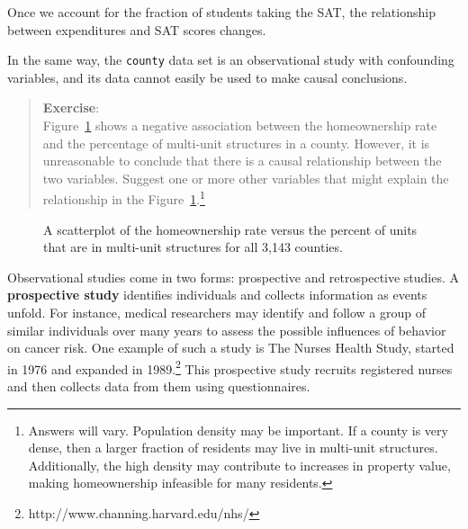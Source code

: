 \documentclass[
  letterpaper,
  DIV=11,
  numbers=noendperiod]{scrreprt}
\begin{document}
Once we account for the fraction of students taking the SAT, the
relationship between expenditures and SAT scores changes.

In the same way, the \texttt{county} data set is an observational study
with confounding variables, and its data cannot easily be used to make
causal conclusions.

\begin{quote}
\textbf{Exercise}:\\
Figure~\ref{fig-homeown2} shows a negative association between the
homeownership rate and the percentage of multi-unit structures in a
county. However, it is unreasonable to conclude that there is a causal
relationship between the two variables. Suggest one or more other
variables that might explain the relationship in the
Figure~\ref{fig-homeown2}.\footnote{Answers will vary. Population
  density may be important. If a county is very dense, then a larger
  fraction of residents may live in multi-unit structures. Additionally,
  the high density may contribute to increases in property value, making
  homeownership infeasible for many residents.}
\end{quote}

\begin{figure}


\caption{\label{fig-homeown2}A scatterplot of the homeownership rate
versus the percent of units that are in multi-unit structures for all
3,143 counties.}

\end{figure}%

Observational studies come in two forms: prospective and retrospective
studies. A \textbf{prospective study} identifies individuals and
collects information as events unfold. For instance, medical researchers
may identify and follow a group of similar individuals over many years
to assess the possible influences of behavior on cancer risk. One
example of such a study is The Nurses Health Study, started in 1976 and
expanded in 1989.\footnote{http://www.channing.harvard.edu/nhs/} This
prospective study recruits registered nurses and then collects data from
them using questionnaires.
\end{document}
